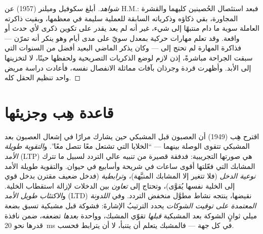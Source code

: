 \begin{proof}[شواهد]
أبلغ سكوفيل وميلنر (1957) عن H.M.: فبعد استئصال الحُصينين
كليهما والقشرة المجاورة، بقي ذكاؤه وذكرياته السابقة للعملية
سليمة في معظمها، وبقيت ذاكرته العاملة سوية ما دام منتبهًا
إلى شيء، غير أنه لم يعد يقدر على تكوين ذكرى لأي حدث أو
واقعة. وقد تعلم مهارات حركية بمعدل سويّ على مدى أيام وهو
ينكر أنه تمرّن --- فذاكرة المهارة لم تحتج إلى  ---
وكان يذكر الماضي البعيد أفضل من السنوات التي سبقت الجراحة
مباشرةً،  إذن لازم لوضع الذكريات التصريحية ولحفظها
حينًا، لا لتخزينها إلى الأبد. وأظهرت قردة وجرذان بآفات
مماثلة الانفصال نفسه، فأعادت دراسة مريض واحد تنظيم الحقل
كله.
\end{proof}

\section{قاعدة هِب وجزيئها}

\begin{definition}\label{def:b3:learning-memory:ltp}
اقترح هِب (1949) أن العصبون قبل المشبكي حين يشارك مرارًا في
إشعال العصبون بعد المشبكي تتقوى الوصلة بينهما --- ``الخلايا
التي تشتعل معًا تتصل معًا''. و\emph{التقوية طويلة الأمد}
(LTP) هي صورتها التجريبية: فدفقة قصيرة من تنبيه عالي التردد
لسبيل ما تترك المشابك التي فعّلتها أقوى ساعات في شريحة
وأسابيع في حيوان. والتقوية طويلة الأمد \emph{نوعية الدخل}
(فلا تتغير إلا المشابك المنبَّهة)، و\emph{ترابطية} (فدخل
ضعيف مقترن بدخل قوي إلى الخلية نفسها يُقوَّى)، وتحتاج إلى
\emph{تعاون} بين الدخلات لإزالة استقطاب الخلية.
و\emph{الاكتئاب طويل الأمد} (LTD) نقيضها، ينتجه نشاط مطوَّل
منخفض التردد. وفي \emph{اللدونة المعتمدة على توقيت الشوكات}
يحدد الترتيبُ الإشارةَ: فشوكة قبل مشبكية تسبق بضعة ميلي
ثوانٍ الشوكة بعد المشبكية \emph{قبلها} تقوّي المشبك، وواحدة
\emph{بعدها} تضعفه، ضمن نافذة قدرها نحو \qty{20}{ms} في كل
جهة --- فالمشبك يتعلم أن يتنبأ، لا أن يترابط فحسب.
\end{definition}

